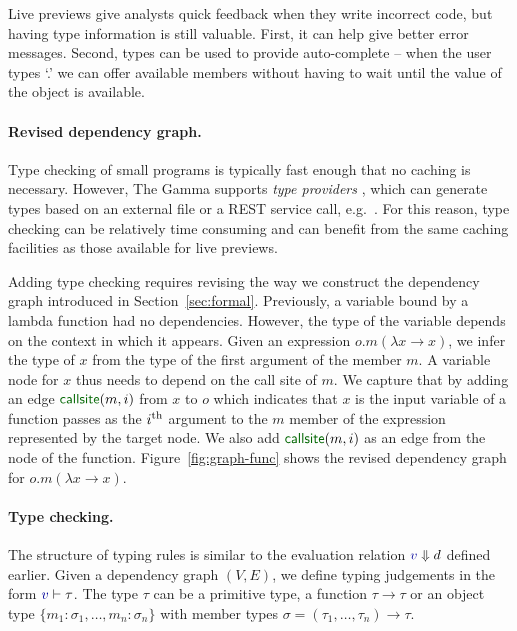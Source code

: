 \documentclass[english,submission]{programming}
\theoremstyle{plain}
\theoremstyle{definition}
\newcommand{\bndclr}[1]{\textcolor{kvdclr}{#1}}
\newcommand{\blbl}[1]{\textnormal{\textcolor{numclr}{\sffamily #1}}}
\begin{document}
Live previews give analysts quick feedback when they write incorrect code, but
having type information is still valuable. First, it can help give better error messages. Second,
types can be used to provide auto-complete -- when the user types `.' we can offer available
members without having to wait until the value of the object is available.

\paragraph{Revised dependency graph.}
Type checking of small programs is typically fast enough that no caching is necessary. However,
The Gamma supports \emph{type providers} \cite{providers-fsharp,providers-idris}, which can
generate types based on an external file or a REST service call, e.g.~\cite{fsdata}. For this
reason, type checking can be relatively time consuming and can benefit from the same caching
facilities as those available for live previews.

Adding type checking requires revising the way we construct the dependency graph introduced in
Section~\ref{sec:formal}. Previously, a variable bound by a lambda function had no dependencies.
However, the type of the variable depends on the context in which it appears. Given an expression
$o.m(\lambda x\rightarrow x)$, we infer the type of $x$ from the type of the first argument
of the member $m$. A variable node for $x$ thus needs to depend on the call site of $m$.
We capture that by adding an edge $\blbl{callsite}(m, i)$ from $x$ to $o$ which indicates that
$x$ is the input variable of a function passes as the $i^\textnormal{th}$ argument to the $m$
member of the expression represented by the target node. We also add $\blbl{callsite}(m, i)$
as an edge from the node of the function. Figure~\ref{fig:graph-func} shows the
revised dependency graph for $o.m(\lambda x\rightarrow x)$. %

\paragraph{Type checking.}
The structure of typing rules is similar to the evaluation relation $\bndclr{v}\Downarrow d$
defined earlier. Given a dependency graph $(V, E)$, we define typing judgements in the form
$\bndclr{v}\vdash \tau$. The type $\tau$ can be a primitive type, a function $\tau \rightarrow \tau$
or an object type $\{m_1\!:\!\sigma_1, \ldots, m_n\!:\!\sigma_n\}$ with member types
$\sigma = (\tau_1, \ldots, \tau_n) \rightarrow \tau$.
\end{document}
